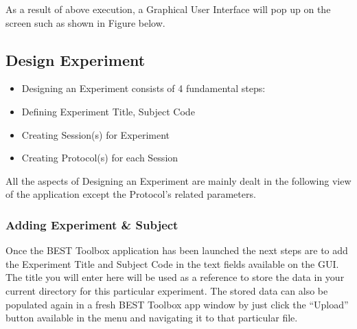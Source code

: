 \documentclass[letterpaper,10pt,english]{sphinxmanual}
\begin{document}
\begin{sphinxVerbatim}[commandchars=\\\{\}]
\end{sphinxVerbatim}

\sphinxAtStartPar
As a result of above execution, a Graphical User Interface will pop up on the screen such as shown in Figure below.

\begin{figure}[htbp]
\centering

\noindent{}
\end{figure}


\subsection{Design Experiment}
\label{\detokenize{4_DesignExperiment:design-experiment}}\label{\detokenize{4_DesignExperiment::doc}}\begin{itemize}
\item {} 
\sphinxAtStartPar
Designing an Experiment consists of 4 fundamental steps:

\item {} 
\sphinxAtStartPar
Defining Experiment Title, Subject Code

\item {} 
\sphinxAtStartPar
Creating Session(s) for Experiment

\item {} 
\sphinxAtStartPar
Creating Protocol(s) for each Session

\end{itemize}

\sphinxAtStartPar
All the aspects of Designing an Experiment are mainly dealt in the following view of the application except the Protocol’s related parameters.

\begin{figure}[htbp]
\centering

\noindent{}
\end{figure}


\subsubsection{Adding Experiment \& Subject}
\label{\detokenize{4_DesignExperiment:adding-experiment-subject}}
\sphinxAtStartPar
Once the BEST Toolbox application has been launched the next steps are to add the Experiment Title and Subject Code in the text fields available on the GUI. The title you will enter here will be used as a reference to store the data in your current directory for this particular experiment. The stored data can also be populated again in a fresh BEST Toolbox app window by just click the “Upload” button available in the menu and navigating it to that particular file.
\end{document}
